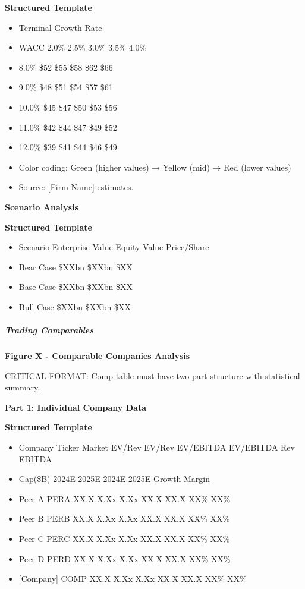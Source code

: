 \documentclass[11pt]{article}
\begin{document}
\textbf{Structured Template}
\begin{itemize}[leftmargin=*,itemsep=2pt,topsep=2pt]
\item {} Terminal Growth Rate
\item {} WACC 2.0\% 2.5\% 3.0\% 3.5\% 4.0\%
\item {} 8.0\% \$52 \$55 \$58 \$62 \$66
\item {} 9.0\% \$48 \$51 \$54 \$57 \$61
\item {} 10.0\% \$45 \$47 \$50 \$53 \$56
\item {} 11.0\% \$42 \$44 \$47 \$49 \$52
\item {} 12.0\% \$39 \$41 \$44 \$46 \$49
\item {} Color coding: Green (higher values) → Yellow (mid) → Red (lower values)
\item {} Source: [Firm Name] estimates.
\end{itemize}

\textbf{Scenario Analysis}

\textbf{Structured Template}
\begin{itemize}[leftmargin=*,itemsep=2pt,topsep=2pt]
\item {} Scenario Enterprise Value Equity Value Price/Share
\item {} Bear Case \$XXbn \$XXbn \$XX
\item {} Base Case \$XXbn \$XXbn \$XX
\item {} Bull Case \$XXbn \$XXbn \$XX
\end{itemize}

\subparagraph{Trading Comparables}\mbox{}\par

\textbf{Figure X - Comparable Companies Analysis}


CRITICAL FORMAT: Comp table must have two-part structure with statistical summary.


\textbf{Part 1: Individual Company Data}

\textbf{Structured Template}
\begin{itemize}[leftmargin=*,itemsep=2pt,topsep=2pt]
\item {} Company Ticker Market EV/Rev EV/Rev EV/EBITDA EV/EBITDA Rev EBITDA
\item {} Cap(\$B) 2024E 2025E 2024E 2025E Growth Margin
\item {} Peer A PERA XX.X X.Xx X.Xx XX.X XX.X XX\% XX\%
\item {} Peer B PERB XX.X X.Xx X.Xx XX.X XX.X XX\% XX\%
\item {} Peer C PERC XX.X X.Xx X.Xx XX.X XX.X XX\% XX\%
\item {} Peer D PERD XX.X X.Xx X.Xx XX.X XX.X XX\% XX\%
\item {} [Company] COMP XX.X X.Xx X.Xx XX.X XX.X XX\% XX\%
\end{itemize}
\end{document}
